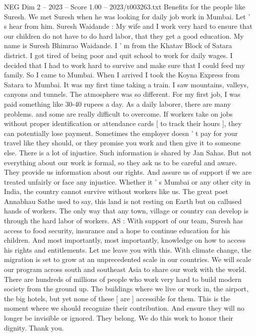 \begin{textsample}{NEG Dim 2 – 2023 – Score 1.00 – 2023/t003263.txt}
Benefits for the people like Suresh.
We met Suresh when he was looking for daily job work in Mumbai.
Let ' s hear from him.
Suresh Waidande : My wife and I work very hard to ensure that our children do not have to do hard labor, that they get a good education.
My name is Suresh Bhimrao Waidande.
I ' m from the Khatav Block of Satara district.
I got tired of being poor and quit school to work for daily wages.
I decided that I had to work hard to survive and make sure that I could feed my family.
So I came to Mumbai.
When I arrived I took the Koyna Express from Satara to Mumbai.
It was my first time taking a train.
I saw mountains, valleys, canyons and tunnels.
The atmosphere was so different.
For my first job, I was paid something like 30-40 rupees a day.
As a daily laborer, there are many problems. and some are really difficult to overcome.
If workers take on jobs without proper identification or attendance cards [ to track their hours ], they can potentially lose payment.
Sometimes the employer doesn ' t pay for your travel like they should, or they promise you work and then give it to someone else.
There is a lot of injustice.
Such information is shared by Jan Sahas.
But not everything about our work is formal, so they ask us to be careful and aware.
They provide us information about our rights.
And assure us of support if we are treated unfairly or face any injustice.
Whether it ' s Mumbai or any other city in India, the country cannot survive without workers like us.
The great poet Annabhau Sathe used to say, this land is not resting on Earth but on callused hands of workers.
The only way that any town, village or country can develop is through the hard labor of workers.
AS : With support of our team, Suresh has access to food security, insurance and a hope to continue education for his children.
And most importantly, most importantly, knowledge on how to access his rights and entitlements.
Let me leave you with this.
With climate change, the migration is set to grow at an unprecedented scale in our countries.
We will scale our program across south and southeast Asia to share our work with the world.
There are hundreds of millions of people who work very hard to build modern society from the ground up.
The buildings where we live or work in, the airport, the big hotels, but yet none of these [ are ] accessible for them.
This is the moment where we should recognize their contribution.
And ensure they will no longer be invisible or ignored.
They belong.
We do this work to honor their dignity.
Thank you.

\end{textsample}
